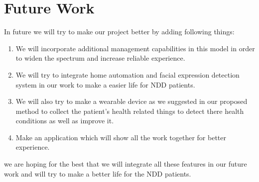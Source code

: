 \section{Future Work}
In future we will try to make our project better by adding following things:
\begin{enumerate}
    \item We will incorporate additional management capabilities in this model in order to widen the spectrum and increase reliable experience.
    \item  We will try to integrate home automation and facial expression detection system in our work to make a easier life for NDD patients.
    \item We will also try to make a wearable device as we suggested in our proposed method to collect the patient's health related things to detect there health conditions as well as improve it.
    \item Make an application which will show all the work together for better experience.
\end{enumerate}
 we are hoping for the best that we will integrate all these features in our future work and will try to make a better life for the NDD patients.



